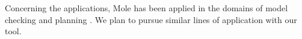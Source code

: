 \documentclass[11pt,a4paper]{article}
\begin{document}
Concerning the applications, Mole has been applied in the domains of model
checking and planning .  We plan to pursue similar lines of
application with our tool.


%

\nocite{*}



\end{document}
